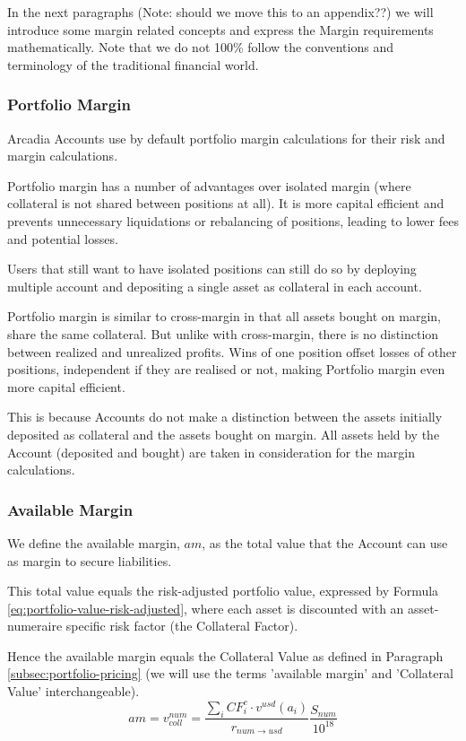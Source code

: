\documentclass[sigconf,nonacm]{acmart}
\begin{document}
In the next paragraphs (Note: should we move this to an appendix??) we will introduce some margin related concepts and express the Margin requirements mathematically.
Note that we do not 100\% follow the conventions and terminology of the traditional financial world.

\subsubsection{Portfolio Margin}
Arcadia Accounts use by default portfolio margin calculations for their risk and margin calculations.

Portfolio margin has a number of advantages over isolated margin (where collateral is not shared between positions at all).
It is more capital efficient and prevents unnecessary liquidations or rebalancing of positions, leading to lower fees and potential losses.

Users that still want to have isolated positions can still do so by deploying multiple account and depositing a single asset as collateral in each account.

Portfolio margin is similar to cross-margin in that all assets bought on margin, share the same collateral.
But unlike with cross-margin, there is no distinction between realized and unrealized profits.
Wins of one position offset losses of other positions, independent if they are realised or not,
making Portfolio margin even more capital efficient.

This is because Accounts do not make a distinction between the assets initially deposited as collateral and the assets bought on margin.
All assets held by the Account (deposited and bought) are taken in consideration for the margin calculations.

\subsubsection{Available Margin}
\label{subsubsec:available-margin}
We define the available margin, $am$, as the total value that the Account can use as margin to secure liabilities.

This total value equals the risk-adjusted portfolio value, expressed by Formula \ref{eq:portfolio-value-risk-adjusted},
where each asset is discounted with an asset-numeraire specific risk factor (the Collateral Factor).

Hence the available margin equals the Collateral Value as defined in Paragraph \ref{subsec:portfolio-pricing}
(we will use the terms 'available margin' and 'Collateral Value' interchangeable).
\begin{equation}
    \label{eq:available-margin}
    am = v_{coll}^{num} = \frac{\sum_{i}{CF_{i}^{c} \cdot v^{usd}(a_{i})}}{r_{num\rightarrow usd}}\frac{S_{num}}{10^{18}}
\end{equation}
\end{document}
